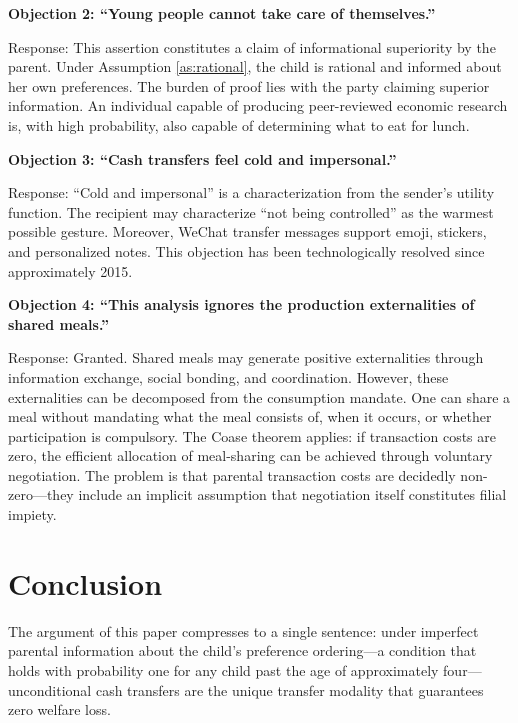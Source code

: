 \documentclass[AER]{AEA}
\begin{document}
\textbf{Objection 2: ``Young people cannot take care of themselves.''}

Response: This assertion constitutes a claim of informational superiority by the parent. Under Assumption \ref{as:rational}, the child is rational and informed about her own preferences. The burden of proof lies with the party claiming superior information. An individual capable of producing peer-reviewed economic research is, with high probability, also capable of determining what to eat for lunch.

\textbf{Objection 3: ``Cash transfers feel cold and impersonal.''}

Response: ``Cold and impersonal'' is a characterization from the sender's utility function. The recipient may characterize ``not being controlled'' as the warmest possible gesture. Moreover, WeChat transfer messages support emoji, stickers, and personalized notes. This objection has been technologically resolved since approximately 2015.

\textbf{Objection 4: ``This analysis ignores the production externalities of shared meals.''}

Response: Granted. Shared meals may generate positive externalities through information exchange, social bonding, and coordination. However, these externalities can be decomposed from the consumption mandate. One can share a meal without mandating what the meal consists of, when it occurs, or whether participation is compulsory. The Coase theorem applies: if transaction costs are zero, the efficient allocation of meal-sharing can be achieved through voluntary negotiation. The problem is that parental transaction costs are decidedly non-zero---they include an implicit assumption that negotiation itself constitutes filial impiety.

\section{Conclusion}\label{sec:conclusion}

The argument of this paper compresses to a single sentence: under imperfect parental information about the child's preference ordering---a condition that holds with probability one for any child past the age of approximately four---unconditional cash transfers are the unique transfer modality that guarantees zero welfare loss.
\end{document}
